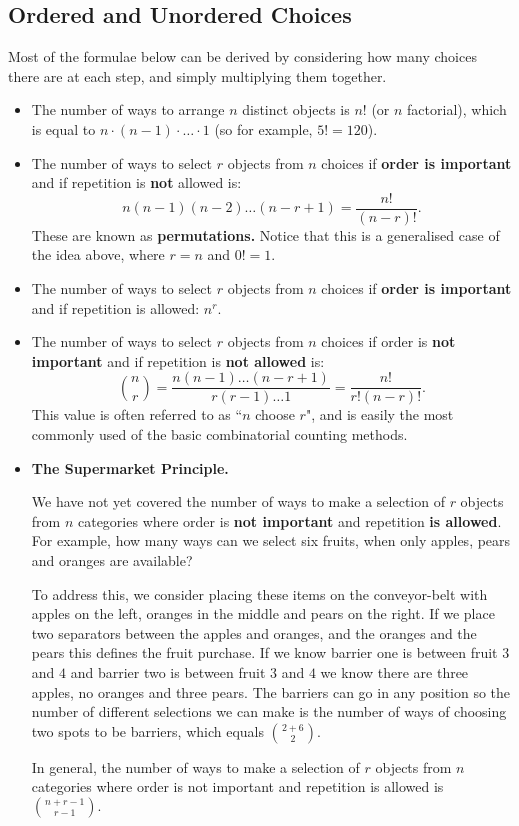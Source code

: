 \documentclass[12pt]{article}
\begin{document}
\subsection{Ordered and Unordered Choices}
Most of the formulae below can be derived by considering how many choices there are at each step, and simply multiplying them together.
\begin{itemize}
	\item The number of ways to arrange $n$ distinct objects is $n!$ (or $n$ factorial), which is equal to $n\cdot (n-1)\cdot \dots\cdot 1$ (so for example, $5!=120$).
	\item The number of ways to select $r$ objects from $n$ choices if \textbf{order is important} and if repetition is \textbf{not} allowed is: \[\boxed{n(n-1)(n-2)\dots (n-r+1)=\frac{n!}{(n-r)!}.}\] These are known as \textbf{permutations.} Notice that this is a generalised case of the idea above, where $r=n$ and $0!=1$.
	\item The number of ways to select $r$ objects from $n$ choices if \textbf{order is important} and if repetition is allowed: $\boxed{n^r}$.
	\item The number of ways to select $r$ objects from $n$ choices if order is \textbf{not important} and if repetition is \textbf{not allowed} is: \[\boxed{\binom{n}{r}=\frac{n(n-1)\dots (n-r+1)}{r(r-1)\dots 1}=\frac{n!}{r!(n-r)!}.}\] This value is often referred to as ``$n$ choose $r$", and is easily the most commonly used of the basic combinatorial counting methods.
	\item \textbf{The Supermarket Principle.}
	
	\vspace{2mm}
	
	\noindent We have not yet covered the number of ways to make a selection of $r$ objects from $n$ categories where order is \textbf{not important} and repetition \textbf{is allowed}. For example, how many ways can we select six fruits, when only apples, pears and oranges are available?
	
	\vspace{2mm}
	
	\noindent To address this, we consider placing these items on the conveyor-belt with apples on the left, oranges in the middle and pears on the right. If we place two separators between the apples and oranges, and the oranges and the pears this defines the fruit purchase. If we know barrier one is between fruit $3$ and $4$ and barrier two is between fruit $3$ and $4$ we know there are three apples, no oranges and three pears. The barriers can go in any position so the number of different selections we can make is the number of ways of choosing two spots to be barriers, which equals $\binom{2+6}{2}$.
	\vspace{2mm}
	
	\noindent In general, the number of ways to make a selection of $r$ objects from $n$ categories where order is not important and repetition is allowed is $\boxed{\binom{n+r-1}{r-1}.}$
\end{itemize}
\end{document}
